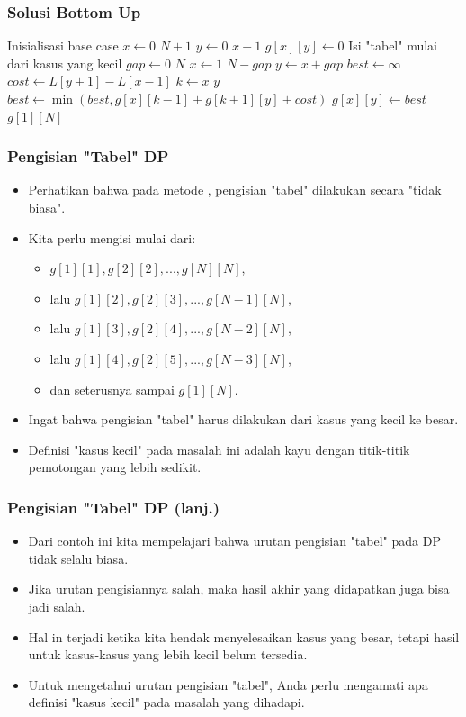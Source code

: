 \begin{frame}
\frametitle{Solusi Bottom Up}
\begin{small}
\begin{codebox}
\li \Comment Inisialisasi base case
\li \For $x \gets 0$ \To $N+1$ \Do
\li   \For $y \gets 0$ \To $x-1$ \Do
\li     $g[x][y] \gets 0$
      \End
    \End
\zi
\li \Comment Isi "tabel" mulai dari kasus yang kecil
\li \For $gap \gets 0$ \To $N$ \Do
\li   \For $x \gets 1$ \To $N-gap$ \Do
\li     $y \gets x + gap$
\li     $best \gets \infty$
\li     $cost \gets L[y+1] - L[x-1]$
\li     \For $k \gets x$ \To $y$ \Do
\li       $best \gets \min(best, g[x][k-1] + g[k+1][y] + cost)$
        \End  
\li     $g[x][y] \gets best$
      \End
    \End
\zi
\li \Return $g[1][N]$
\end{codebox}
\end{small}
\end{frame}

\begin{frame}
\frametitle{Pengisian "Tabel" DP}
\begin{itemize}
  \item Perhatikan bahwa pada metode \fbottomup, pengisian "tabel" dilakukan secara "tidak biasa".
  \item Kita perlu mengisi mulai dari:
  \begin{itemize}
    \item $g[1][1], g[2][2], ..., g[N][N]$,
    \item lalu $g[1][2], g[2][3], ..., g[N-1][N]$,
    \item lalu $g[1][3], g[2][4], ..., g[N-2][N]$,
    \item lalu $g[1][4], g[2][5], ..., g[N-3][N]$,    
    \item dan seterusnya sampai $g[1][N]$.
  \end{itemize}
  \item Ingat bahwa pengisian "tabel" harus dilakukan dari kasus yang kecil ke besar.
  \item Definisi "kasus kecil" pada masalah ini adalah kayu dengan titik-titik pemotongan yang lebih sedikit.
\end{itemize}
\end{frame}

\begin{frame}
\frametitle{Pengisian "Tabel" DP (lanj.)}
\begin{itemize}
  \item Dari contoh ini kita mempelajari bahwa urutan pengisian "tabel" pada DP \fbottomup tidak selalu biasa.
  \item Jika urutan pengisiannya salah, maka hasil akhir yang didapatkan juga bisa jadi salah.
  \item Hal in terjadi ketika kita hendak menyelesaikan kasus yang besar, tetapi hasil untuk kasus-kasus yang lebih kecil belum tersedia.
  \item Untuk mengetahui urutan pengisian "tabel", Anda perlu mengamati apa definisi "kasus kecil" pada masalah yang dihadapi.
\end{itemize}
\end{frame}

